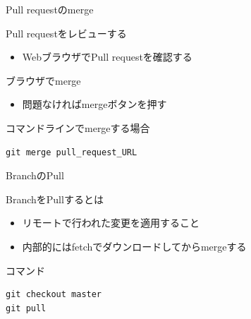 \documentclass[t, aspectratio=169]{beamer}
\begin{document}
\begin{frame}[fragile,label=sec-3-3-2]{Pull requestのmerge}
 \begin{block}{Pull requestをレビューする}
\begin{itemize}
\item WebブラウザでPull requestを確認する
\end{itemize}
\end{block}
\begin{block}{ブラウザでmerge}
\begin{itemize}
\item 問題なければmergeボタンを押す
\end{itemize}
\end{block}
\begin{block}{コマンドラインでmergeする場合}
\begin{verbatim}
git merge pull_request_URL
\end{verbatim}
\end{block}
\end{frame}

\begin{frame}[fragile,label=sec-3-3-3]{BranchのPull}
 \begin{block}{BranchをPullするとは}
\begin{itemize}
\item リモートで行われた変更を適用すること
\item 内部的にはfetchでダウンロードしてからmergeする
\end{itemize}
\end{block}
\begin{block}{コマンド}
\begin{verbatim}
git checkout master
git pull
\end{verbatim}
\end{block}
\end{frame}
\end{document}
